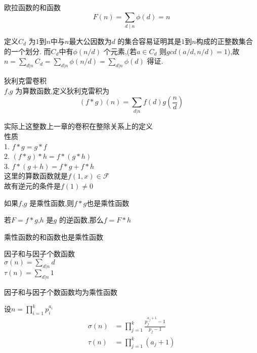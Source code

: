 \begin{proposition}
  欧拉函数的和函数
  $$
  F(n)=\sum_{d \mid n} \phi(d)=n
  $$
\end{proposition}

\begin{proposition}
  定义$C_d$ 为$1$到$n$中与$n$最大公因数为$d$ 的集合容易证明其是$1$到$n$构成的正整数集合的一个划分.
而$C_d$中有$\phi(n/d) $ 个元素,(若$a\in C_d$ 则$ gcd(a/d,n/d)=1 $),故$n=\sum_{d|n}C_d=\sum_{d|n}\phi(n/d)=\sum_{d|n}\phi(d)$ 得证.
\end{proposition}

\begin{definition}
  狄利克雷卷积\\
  $f$,$g$ 为算数函数,定义狄利克雷积为
  $$
  (f*g)(n)=\sum_{d|n}f(d)g\left(\frac{n}{d} \right)
  $$
\end{definition}
实际上这整数上一章的卷积在整除关系上的定义\\


性质\\
1. $f*g=g*f$\\
2. $(f*g)*h=f*(g*h) $\\
3. $f*(g+h)=f*g+f*h $\\

这里的算数函数就是$f(1,x)\in \mathcal{F}$\\
故有逆元的条件是$f(1)\neq 0$\\

\begin{theorem}
  如果$f$,$g$ 是乘性函数,则$f*g$也是乘性函数
\end{theorem}


\begin{theorem}
  若$F=f*g$,$h$ 是$g$ 的逆函数,那么$f=F*h$
\end{theorem}

\begin{theorem}
  乘性函数的和函数也是乘性函数
\end{theorem}

\begin{definition}
  因子和与因子个数函数\\
  $\sigma(n)=\sum_{d|n} d $\\
  $\tau(n)=\sum_{d|n}1 $
\end{definition}

\begin{proposition}
  因子和与因子个数函数均为乘性函数
\end{proposition}

\begin{proposition}
  设$n=\prod_{i=1}^{k} p_i^{a_i}$\\
  \[
    \begin{aligned}
      \sigma(n)&=\prod_{j=1}^{k} \frac{p_j^{a_j+1}-1}{p_j-1}\\
      \tau(n)&=\prod_{j=1}^{k} (a_j+1)
    \end{aligned}
  \]
\end{proposition}


